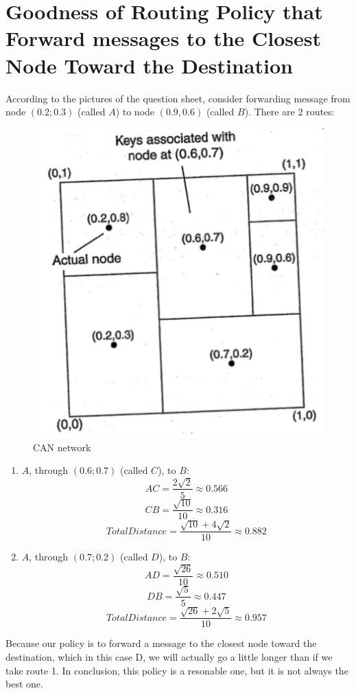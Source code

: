 \documentclass[11pt,a4paper]{article}
\begin{document}
	\section{Goodness of Routing Policy that Forward messages to the Closest Node Toward the Destination}
		According to the pictures of the question sheet, consider forwarding message from node $(0.2;0.3)$ (called $A$) to node $(0.9, 0.6)$ (called $B$). There are 2 routes:
		\newpage
		\begin{figure}[h!]
  			\includegraphics[width=\linewidth]{can-map.png}
  			\caption{CAN network}
  			\label{fig:CAN}
		\end{figure}
		\begin{enumerate}
			\item $A$, through $(0.6;0.7)$ (called $C$), to $B$:
				\[AC = \frac{2\sqrt{2}}{5} \approx 0.566\]
				\[CB = \frac{\sqrt{10}}{10} \approx 0.316\]
				\[TotalDistance = \frac{\sqrt{10} + 4\sqrt{2}}{10} \approx 0.882\]
			\item $A$, through $(0.7;0.2)$ (called $D$), to $B$:
				\[AD = \frac{\sqrt{26}}{10} \approx 0.510\]
				\[DB = \frac{\sqrt{5}}{5} \approx 0.447\]
				\[TotalDistance = \frac{\sqrt{26} + 2\sqrt{5}}{10} \approx 0.957\]
		\end{enumerate}		
		Because our policy is to forward a message to the closest
node toward the destination, which in this case D, we will actually go a little longer than if we take route 1. In conclusion, this policy is a resonable one, but it is not always the best one.
\end{document}
